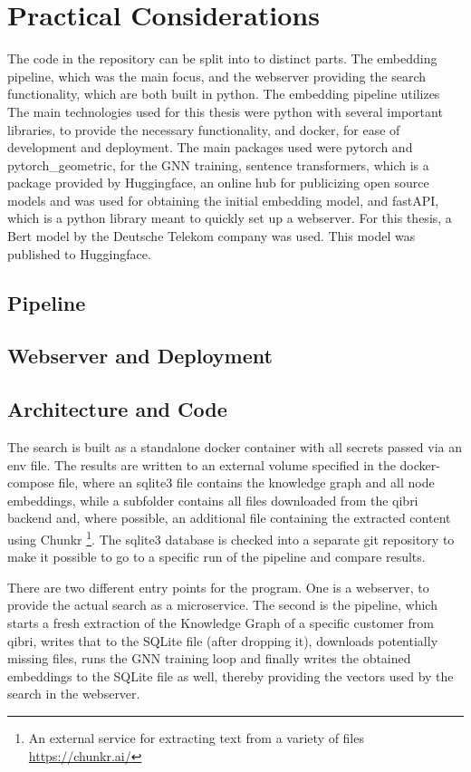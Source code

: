 \documentclass[draft,final]{vutinfth} %
\begin{document}
\chapter{Practical Considerations}
The code in the repository can be split into to distinct parts. The embedding pipeline, which was the main focus, and the webserver providing the search functionality, which are both built in python. The embedding pipeline utilizes 
The main technologies used for this thesis were python with several important libraries, to provide the necessary functionality, and docker, for ease of development and deployment. The main packages used were pytorch and pytorch\_geometric, for the GNN training, sentence transformers, which is a package provided by Huggingface, an online hub for publicizing open source models and was used for obtaining the initial embedding model, and fastAPI, which is a python library meant to quickly set up a webserver.
For this thesis, a Bert model by the Deutsche Telekom company was used. This model was published to Huggingface. \cite{german_bert}

\section{Pipeline}

\section{Webserver and Deployment}


\section{Architecture and Code}
The search is built as a standalone docker container with all secrets passed via an env file. The results are written to an external volume specified in the docker-compose file, where an sqlite3 file contains the knowledge graph and all node embeddings, while a subfolder contains all files downloaded from the qibri backend and, where possible, an additional file containing the extracted content using Chunkr \footnote{An external service for extracting text from a variety of files \url{https://chunkr.ai/}}. The sqlite3 database is checked into a separate git repository to make it possible to go to a specific run of the pipeline and compare results.

There are two different entry points for the program. One is a webserver, to provide the actual search as a microservice. The second is the pipeline, which starts a fresh extraction of the Knowledge Graph of a specific customer from qibri, writes that to the SQLite file (after dropping it), downloads potentially missing files, runs the GNN training loop and finally writes the obtained embeddings to the SQLite file as well, thereby providing the vectors used by the search in the webserver.
\end{document}
